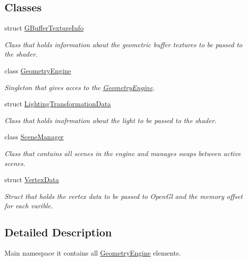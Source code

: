 \subsection*{Classes}
\begin{DoxyCompactItemize}
\item 
struct \mbox{\hyperlink{struct_geometry_engine_1_1_g_buffer_texture_info}{G\+Buffer\+Texture\+Info}}
\begin{DoxyCompactList}\small\item\em Class that holds information about the geometric buffer textures to be passed to the shader. \end{DoxyCompactList}\item 
class \mbox{\hyperlink{class_geometry_engine_1_1_geometry_engine}{Geometry\+Engine}}
\begin{DoxyCompactList}\small\item\em Singleton that gives acces to the \mbox{\hyperlink{class_geometry_engine_1_1_geometry_engine}{Geometry\+Engine}}. \end{DoxyCompactList}\item 
struct \mbox{\hyperlink{struct_geometry_engine_1_1_lighting_transformation_data}{Lighting\+Transformation\+Data}}
\begin{DoxyCompactList}\small\item\em Class that holds inofrmation about the light to be passed to the shader. \end{DoxyCompactList}\item 
class \mbox{\hyperlink{class_geometry_engine_1_1_scene_manager}{Scene\+Manager}}
\begin{DoxyCompactList}\small\item\em Class that contains all scenes in the engine and manages swaps between active scenes. \end{DoxyCompactList}\item 
struct \mbox{\hyperlink{struct_geometry_engine_1_1_vertex_data}{Vertex\+Data}}
\begin{DoxyCompactList}\small\item\em Struct that holds the vertex data to be passed to Open\+Gl and the memory offset for each varible. \end{DoxyCompactList}\end{DoxyCompactItemize}


\subsection{Detailed Description}
Main namespace it contains all \mbox{\hyperlink{namespace_geometry_engine}{Geometry\+Engine}} elements. 